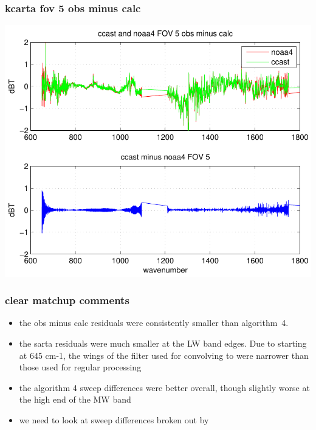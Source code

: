 \documentclass[11pt]{beamer}
\begin{document}
\begin{frame}
\frametitle{kcarta fov 5 obs minus calc}
\begin{center}
  \includegraphics[scale=0.7]{figures/kcarta_FOV5.pdf}
\end{center}
\end{frame}
\begin{frame}
\frametitle{clear matchup comments}

\begin{itemize}

  \item the {\ccast} obs minus calc residuals were consistently
    smaller than {\noaa} algorithm~4.

  \item the {\ccast} {\iasi} sarta residuals were much smaller at
    the LW band edges.  Due to {\iasi} starting at 645 cm-1, the
    wings of the filter used for convolving {\iasi} to {\cris} were
    narrower than those used for regular {\ccast} processing
    
  \item the {\noaa} algorithm 4 sweep differences were better overall,
    though slightly worse at the high end of the MW band
    
  \item we need to look at sweep differences broken out by {\fov}

\end{itemize}

\end{frame}
\end{document}
